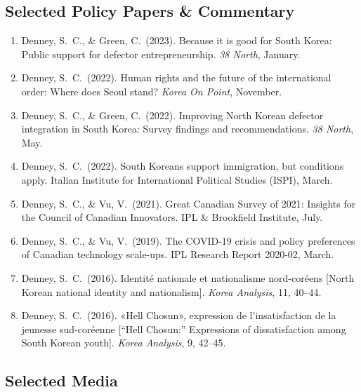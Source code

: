 \documentclass[11pt, a4paper]{article}
\begin{document}
\subsection{Selected Policy Papers \& Commentary}

\begin{enumerate}[itemsep=0.15em]
  \item Denney, S.\ C., \& Green, C.\ (2023). Because it is good for South Korea: Public support for defector entrepreneurship. \textit{38 North}, January.

  \item Denney, S.\ C.\ (2022). Human rights and the future of the international order: Where does Seoul stand? \textit{Korea On Point}, November.

  \item Denney, S.\ C., \& Green, C.\ (2022). Improving North Korean defector integration in South Korea: Survey findings and recommendations. \textit{38 North}, May.

  \item Denney, S.\ C.\ (2022). South Koreans support immigration, but conditions apply. Italian Institute for International Political Studies (ISPI), March.

  \item Denney, S.\ C., \& Vu, V.\ (2021). Great Canadian Survey of 2021: Insights for the Council of Canadian Innovators. IPL \& Brookfield Institute, July.

  \item Denney, S.\ C., \& Vu, V.\ (2019). The COVID-19 crisis and policy preferences of Canadian technology scale-ups. IPL Research Report 2020-02, March.

  \item Denney, S.\ C.\ (2016). Identité nationale et nationalisme nord-coréens [North Korean national identity and nationalism]. \textit{Korea Analysis}, 11, 40--44.

  \item Denney, S.\ C.\ (2016). «Hell Chosun», expression de l'insatisfaction de la jeunesse sud-coréenne [``Hell Chosun:'' Expressions of dissatisfaction among South Korean youth]. \textit{Korea Analysis}, 9, 42--45.
\end{enumerate}

\subsection{Selected Media}
\end{document}
